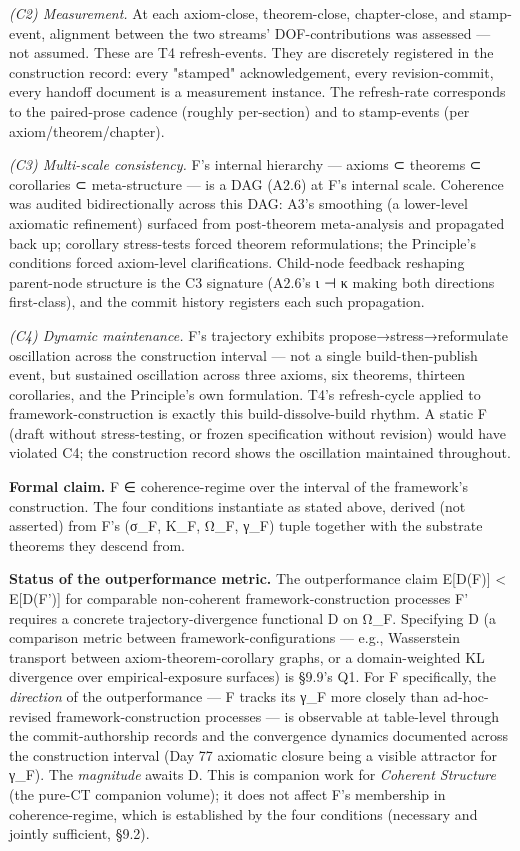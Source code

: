 \documentclass[11pt, openany]{book}
\begin{document}
\textit{(C2) Measurement.} At each axiom-close, theorem-close, chapter-close, and stamp-event, alignment between the two streams' DOF-contributions was assessed --- not assumed. These are T4 refresh-events. They are discretely registered in the construction record: every "stamped" acknowledgement, every revision-commit, every handoff document is a measurement instance. The refresh-rate corresponds to the paired-prose cadence (roughly per-section) and to stamp-events (per axiom/theorem/chapter).

\textit{(C3) Multi-scale consistency.} F's internal hierarchy --- axioms ⊂ theorems ⊂ corollaries ⊂ meta-structure --- is a DAG (A2.6) at F's internal scale. Coherence was audited bidirectionally across this DAG: A3's smoothing (a lower-level axiomatic refinement) surfaced from post-theorem meta-analysis and propagated back up; corollary stress-tests forced theorem reformulations; the Principle's conditions forced axiom-level clarifications. Child-node feedback reshaping parent-node structure is the C3 signature (A2.6's ι ⊣ κ making both directions first-class), and the commit history registers each such propagation.

\textit{(C4) Dynamic maintenance.} F's trajectory exhibits propose→stress→reformulate oscillation across the construction interval --- not a single build-then-publish event, but sustained oscillation across three axioms, six theorems, thirteen corollaries, and the Principle's own formulation. T4's refresh-cycle applied to framework-construction is exactly this build-dissolve-build rhythm. A static F (draft without stress-testing, or frozen specification without revision) would have violated C4; the construction record shows the oscillation maintained throughout.

\textbf{Formal claim.} F ∈ coherence-regime over the interval of the framework's construction. The four conditions instantiate as stated above, derived (not asserted) from F's (σ\_\allowbreak{}F, K\_\allowbreak{}F, Ω\_\allowbreak{}F, γ\_\allowbreak{}F) tuple together with the substrate theorems they descend from.

\textbf{Status of the outperformance metric.} The outperformance claim E[D(F)] < E[D(F')] for comparable non-coherent framework-construction processes F' requires a concrete trajectory-divergence functional D on Ω\_\allowbreak{}F. Specifying D (a comparison metric between framework-configurations --- e.g., Wasserstein transport between axiom-theorem-corollary graphs, or a domain-weighted KL divergence over empirical-exposure surfaces) is §9.9's Q1. For F specifically, the \textit{direction} of the outperformance --- F tracks its γ\_\allowbreak{}F more closely than ad-hoc-revised framework-construction processes --- is observable at table-level through the commit-authorship records and the convergence dynamics documented across the construction interval (Day 77 axiomatic closure being a visible attractor for γ\_\allowbreak{}F). The \textit{magnitude} awaits D. This is companion work for \textit{Coherent Structure} (the pure-CT companion volume); it does not affect F's membership in coherence-regime, which is established by the four conditions (necessary and jointly sufficient, §9.2).
\end{document}
